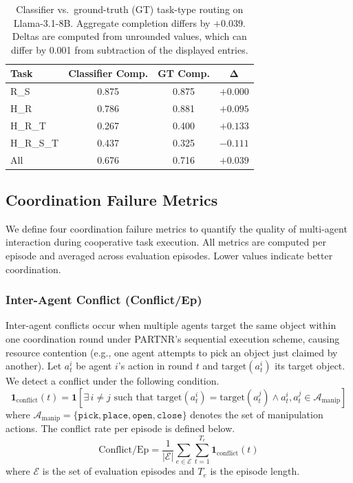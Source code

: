\documentclass{article}
\theoremstyle{plain}
\theoremstyle{definition}
\theoremstyle{remark}
\begin{document}
\begin{table}[h]
\centering
\caption{Classifier vs.\ ground-truth (GT) task-type routing on Llama-3.1-8B. Aggregate completion differs by $+0.039$. Deltas are computed from unrounded values, which can differ by 0.001 from subtraction of the displayed entries.}
\label{tab:gt_vs_oracle}
\begin{tabular}{@{}l|ccc@{}}
\toprule
\textbf{Task} & \textbf{Classifier Comp.} & \textbf{GT Comp.} & $\boldsymbol{\Delta}$ \\
\midrule
R\_S         & 0.875 & 0.875 & $+0.000$ \\
H\_R         & 0.786 & 0.881 & $+0.095$ \\
H\_R\_T      & 0.267 & 0.400 & $+0.133$ \\
H\_R\_S\_T   & 0.437 & 0.325 & $-0.111$ \\
\midrule
All          & 0.676 & 0.716 & $+0.039$ \\
\bottomrule
\end{tabular}
\end{table}
\subsection{Coordination Failure Metrics}
\label{appendix:failure_metrics}

We define four coordination failure metrics to quantify the quality of multi-agent interaction during cooperative task execution. All metrics are computed per episode and averaged across evaluation episodes. Lower values indicate better coordination.

\subsubsection{Inter-Agent Conflict (Conflict/Ep)}

Inter-agent conflicts occur when multiple agents target the same object within one coordination round under PARTNR's sequential execution scheme, causing resource contention (e.g., one agent attempts to pick an object just claimed by another). Let $a_t^i$ be agent $i$'s action in round $t$ and $\text{target}(a_t^i)$ its target object. We detect a conflict under the following condition.
\begin{equation}
    \mathbf{1}_{\text{conflict}}(t) = \mathbf{1}\left[ \exists\, i \neq j \text{ such that } \text{target}(a_t^i) = \text{target}(a_t^j) \land a_t^i, a_t^j \in \mathcal{A}_{\text{manip}} \right]
\end{equation}
where $\mathcal{A}_{\text{manip}} = \{\texttt{pick}, \texttt{place}, \texttt{open}, \texttt{close}\}$ denotes the set of manipulation actions. The conflict rate per episode is defined below.
\begin{equation}
    \text{Conflict/Ep} = \frac{1}{|\mathcal{E}|} \sum_{e \in \mathcal{E}} \sum_{t=1}^{T_e} \mathbf{1}_{\text{conflict}}(t)
\end{equation}
where $\mathcal{E}$ is the set of evaluation episodes and $T_e$ is the episode length.
\end{document}
